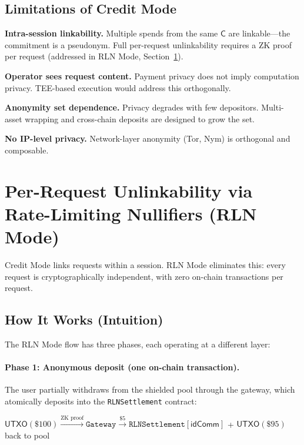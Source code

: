 \documentclass[11pt,a4paper]{article}
\theoremstyle{definition}
\begin{document}
\subsection{Limitations of Credit Mode}

\textbf{Intra-session linkability.} Multiple spends from the same $\mathsf{C}$ are linkable---the commitment is a pseudonym. Full per-request unlinkability requires a ZK proof per request (addressed in RLN Mode, Section~\ref{sec:v2}).

\textbf{Operator sees request content.} Payment privacy does not imply computation privacy. TEE-based execution would address this orthogonally.

\textbf{Anonymity set dependence.} Privacy degrades with few depositors. Multi-asset wrapping and cross-chain deposits are designed to grow the set.

\textbf{No IP-level privacy.} Network-layer anonymity (Tor, Nym) is orthogonal and composable.

\section{Per-Request Unlinkability via Rate-Limiting Nullifiers (RLN Mode)}\label{sec:v2}

Credit Mode links requests within a session. RLN Mode eliminates this: every request is cryptographically independent, with zero on-chain transactions per request.

\subsection{How It Works (Intuition)}

The RLN Mode flow has three phases, each operating at a different layer:

\paragraph{Phase 1: Anonymous deposit (one on-chain transaction).}
The user partially withdraws from the shielded pool through the gateway, which atomically deposits into the \texttt{RLNSettlement} contract:

\begin{center}
\small
$\mathsf{UTXO}(\$100) \xrightarrow{\text{ZK proof}}
\texttt{Gateway} \xrightarrow{\$5}
\texttt{RLNSettlement}[\mathsf{idComm}]$
\quad + \quad
$\mathsf{UTXO}(\$95)$ back to pool
\end{center}
\end{document}
